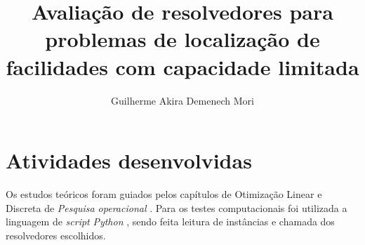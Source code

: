 \documentclass[]{article}
\title{Avaliação de resolvedores para problemas de localização de facilidades com capacidade limitada}
\author{Guilherme Akira Demenech Mori}
\newcommand{ \python }[1]{\textit{#1}}
\newif\ifrelatorio
\newif\ifartigo
\begin{document}
	\maketitle

	\begin{abstract}
	
	\end{abstract}

\ifrelatorio
	\tableofcontents		
	\ifartigo
		\listoftables
	\fi	
\fi

\ifartigo
	\section{Introdução}
\fi	
	
\ifrelatorio	
	\section{Atividades desenvolvidas}
	
		Os estudos teóricos foram guiados pelos capítulos de Otimização Linear e Discreta de \textit{Pesquisa operacional} \cite{arenales}.	
		Para os testes computacionais foi utilizada a linguagem de \textit{script} \python{Python} \cite{Python}, sendo feita leitura de instâncias e chamada dos resolvedores escolhidos.
		
\end{document}
